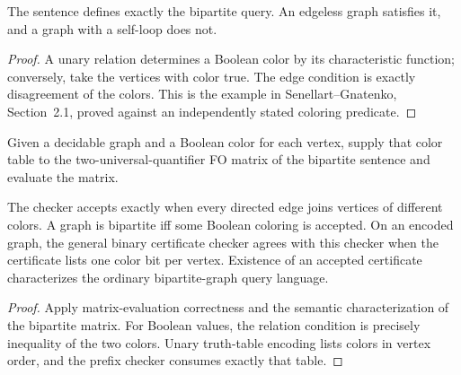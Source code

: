 \begin{theorem}
  \label{thm:desc-bipartite}
  \leanok
  The sentence defines exactly the bipartite query. An edgeless graph satisfies
  it, and a graph with a self-loop does not.
\end{theorem}
\begin{proof}
  \leanok
  A unary relation determines a Boolean color by its characteristic function;
  conversely, take the vertices with color true. The edge condition is exactly
  disagreement of the colors. This is the example in Senellart--Gnatenko,
  Section~2.1, proved against an independently stated coloring predicate.
\end{proof}

\begin{definition}
  \label{def:desc-bipartite-checker}
  \leanok
  Given a decidable graph and a Boolean color for each vertex, supply that color
  table to the two-universal-quantifier FO matrix of the bipartite sentence and
  evaluate the matrix.
\end{definition}

\begin{theorem}
  \label{thm:desc-bipartite-checker}
  \leanok
  The checker accepts exactly when every directed edge joins vertices of
  different colors. A graph is bipartite iff some Boolean coloring is accepted.
  On an encoded graph, the general binary certificate checker agrees with this
  checker when the certificate lists one color bit per vertex. Existence of an
  accepted certificate characterizes the ordinary bipartite-graph query language.
\end{theorem}
\begin{proof}
  \leanok
  Apply matrix-evaluation correctness and the semantic characterization of the
  bipartite matrix. For Boolean values, the relation condition is precisely
  inequality of the two colors. Unary truth-table encoding lists colors in
  vertex order, and the prefix checker consumes exactly that table.
\end{proof}

